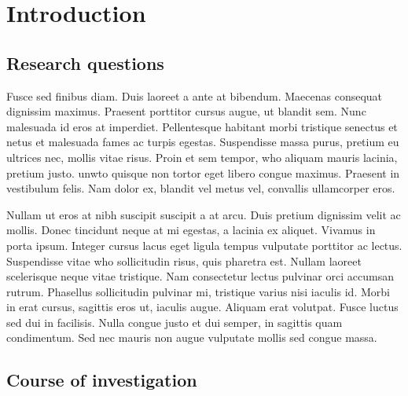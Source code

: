 \documentclass[draft=false
              ,paper=a4
              ,twoside=false
              ,fontsize=12pt
              ,headsepline
              ,BCOR10mm
              ,DIV11
              ]{article}
\begin{document}



\tableofcontents
{}
\listoffigures
{}
\listoftables
{}

\section{Introduction}
\vspace{6pt}
\subsection{Research questions}
\vspace{6pt}

Fusce sed finibus diam. Duis laoreet a ante at bibendum. Maecenas consequat dignissim maximus. Praesent porttitor cursus augue, ut blandit sem. Nunc malesuada id eros at imperdiet. Pellentesque habitant morbi tristique senectus et netus et malesuada fames ac turpis egestas. Suspendisse massa purus, pretium eu ultrices nec, mollis vitae risus. Proin et sem tempor, \gls{who} aliquam mauris lacinia, pretium justo. \gls{unwto} quisque non tortor eget libero congue maximus. Praesent in vestibulum felis. Nam dolor ex, blandit vel metus vel, convallis ullamcorper eros.

Nullam ut eros at nibh suscipit suscipit a at arcu. Duis pretium dignissim velit ac mollis. Donec tincidunt neque at mi egestas, a lacinia ex aliquet. Vivamus in porta ipsum. Integer cursus lacus eget ligula tempus vulputate porttitor ac lectus. Suspendisse vitae \gls{who} sollicitudin risus, quis pharetra est. Nullam laoreet scelerisque neque vitae tristique. Nam consectetur lectus pulvinar orci accumsan rutrum. Phasellus sollicitudin pulvinar mi, tristique varius nisi iaculis id. Morbi in erat cursus, sagittis eros ut, iaculis augue. Aliquam erat volutpat. Fusce luctus sed dui in facilisis. Nulla congue justo et dui semper, in sagittis quam condimentum. Sed nec mauris non augue vulputate mollis sed congue massa.

\vspace{12pt}
\subsection{Course of investigation}
\vspace{6pt}
\end{document}

